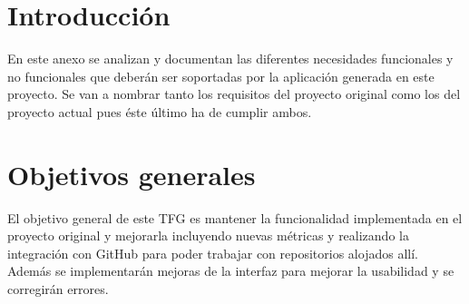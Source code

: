 \label{anex:B}

\section{Introducción}

En este anexo se analizan y documentan las diferentes necesidades funcionales y no funcionales que deberán ser soportadas por la aplicación generada en este proyecto. Se van a nombrar tanto los requisitos del proyecto original\cite{TFGPrevio} como los del proyecto actual pues éste último ha de cumplir ambos.


\section{Objetivos generales}
El objetivo general de este TFG es mantener la funcionalidad implementada en el proyecto original\cite{TFGPrevio} y mejorarla incluyendo nuevas métricas y realizando la integración con GitHub para poder trabajar con repositorios alojados allí. Además se implementarán mejoras de la interfaz para mejorar la usabilidad y se corregirán errores.

